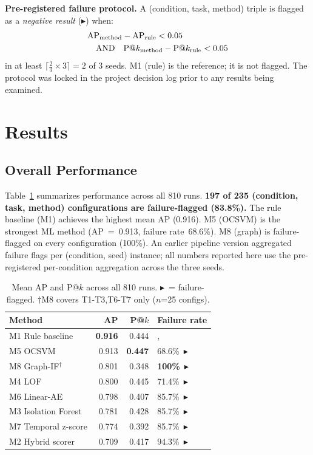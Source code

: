 \documentclass[conference]{IEEEtran}
\newcommand{\fp}{$\blacktriangleright$\xspace}   %
\begin{document}
\textbf{Pre-registered failure protocol.} A (condition, task, method) triple is
flagged as a \emph{negative result} (\fp) when:
\begin{align}
  &\mathrm{AP}_\mathrm{method} - \mathrm{AP}_\mathrm{rule} < 0.05 \notag \\
  &\quad\text{AND}\quad
  \mathrm{P@}k_\mathrm{method} - \mathrm{P@}k_\mathrm{rule} < 0.05
  \label{eq:failure}
\end{align}
in at least $\lceil\frac{2}{3} \times 3\rceil = 2$ of 3 seeds. M1 (rule) is
the reference; it is not flagged. The protocol was locked in the project decision
log prior to any results being examined.

\section{Results}
\label{sec:results}

\subsection{Overall Performance}

Table~\ref{tab:overall} summarizes performance across all 810 runs.
\textbf{197 of 235 (condition, task, method) configurations are failure-flagged
(83.8\%).} The rule baseline (M1) achieves the highest mean AP (0.916). M5 (OCSVM)
is the strongest ML method (AP~=~0.913, failure rate~68.6\%). M8 (graph) is
failure-flagged on every configuration (100\%).
An earlier pipeline version aggregated failure flags per (condition, seed)
instance; all numbers reported here use the pre-registered per-condition
aggregation across the three seeds.

\begin{table}[t]
\centering
\caption{Mean AP and P@$k$ across all 810 runs. \fp\ = failure-flagged.
  $\dagger$M8 covers T1-T3,T6-T7 only ($n$=25 configs).}
\label{tab:overall}
\small
\begin{tabular}{@{}lrrl@{}}
\toprule
Method & AP & P@$k$ & Failure rate \\
\midrule
M1 Rule baseline    & \textbf{0.916} & 0.444 &, \\
M5 OCSVM            & 0.913 & \textbf{0.447} & 68.6\%~\fp \\
M8 Graph-IF$^\dagger$ & 0.801 & 0.348 & \textbf{100\%}~\fp \\
M4 LOF              & 0.800 & 0.445 & 71.4\%~\fp \\
M6 Linear-AE        & 0.798 & 0.407 & 85.7\%~\fp \\
M3 Isolation Forest & 0.781 & 0.428 & 85.7\%~\fp \\
M7 Temporal z-score & 0.774 & 0.392 & 85.7\%~\fp \\
M2 Hybrid scorer    & 0.709 & 0.417 & 94.3\%~\fp \\
\bottomrule
\end{tabular}
\end{table}
\end{document}

